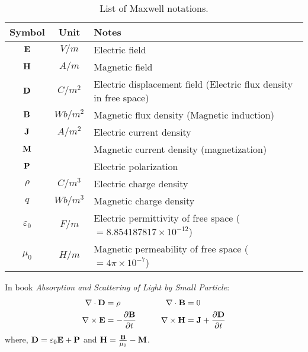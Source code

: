 \begin{table}[h]
	\centering
	\caption[List of Maxwell notations]{\label{tab:background:notation2}
		List of Maxwell notations.
	}
	\begin{tabular}{ccl}
		Symbol & Unit & Notes \\
		\hline
		$\mathbf{E}$ & $V/m$      & Electric field \\
		$\mathbf{H}$ & $A/m$      & Magnetic field \\
		$\mathbf{D}$ & $C/m^2$    & Electric displacement field (Electric flux density in free space) \\
		$\mathbf{B}$ & $Wb/m^2$   & Magnetic flux density (Magnetic induction) \\
		$\mathbf{J}$ & $A/m^2$    & Electric current density \\
		$\mathbf{M}$ &            & Magnetic current density (magnetization)\\
		$\mathbf{P}$ &            & Electric polarization \\
		$\rho$ & $C/m^3$    & Electric charge density \\
		$q$    & $Wb/m^3$   & Magnetic charge density \\
		$\varepsilon_0$     & $F/m$ & Electric permittivity of free space ($=8.854187817\times10^{-12}$) \\
		$\mu_0$             & $H/m$ & Magnetic permeability of free space ($=4\pi\times10^{-7}$) \\
	\end{tabular}
\end{table}



In book \textit{Absorption and Scattering of Light by Small Particle}:
\begin{equation}
	\begin{aligned}
		\nabla\cdot\mathbf{D}  &= \rho & & & & & \nabla\cdot\mathbf{B} &= 0 \\
		\nabla\times\mathbf{E} &= -\frac{\partial\mathbf{B}}{\partial t} & & & & & 
		\nabla\times\mathbf{H} &= \mathbf{J} + \frac{\partial\mathbf{D}}{\partial t}
  \end{aligned}
\end{equation}
where, $\mathbf{D} = \varepsilon_0\mathbf{E} + \mathbf{P}$ and 
	$\mathbf{H} = \frac{\mathbf{B}}{\mu_0} - \mathbf{M}$.

